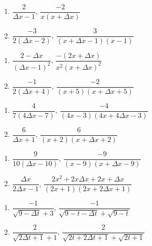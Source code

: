 \begin{multicols}{2}
\begin{enumerate}
\setcounter{enumi}{\value{HW}}

\item  $\dfrac{2}{\Delta x-1}$, $\dfrac{-2}{x(x+\Delta x)}$
\item $\dfrac{-3}{2(\Delta x - 2)}$, $\dfrac{3}{(x+\Delta x-1)(x-1)}$

\setcounter{HW}{\value{enumi}}
\end{enumerate}
\end{multicols}

\begin{multicols}{2}
\begin{enumerate}
\setcounter{enumi}{\value{HW}}

\item  $\dfrac{2-\Delta x}{(\Delta x - 1)^2}$, $\dfrac{-(2x+\Delta x)}{x^2(x+\Delta x)^2}$
\item  $\dfrac{-1}{2(\Delta x+4)}$, $\dfrac{-2}{(x+5)(x+\Delta x+5)}$

\setcounter{HW}{\value{enumi}}
\end{enumerate}
\end{multicols}

\begin{multicols}{2}
\begin{enumerate}
\setcounter{enumi}{\value{HW}}

\item $\dfrac{4}{7(4 \Delta x - 7)}$, $\dfrac{-4}{(4x-3)(4x+4\Delta x-3)}$
\item $\dfrac{6}{\Delta x + 1}$, $\dfrac{6}{(x+2)(x+\Delta x+2)}$

\setcounter{HW}{\value{enumi}}
\end{enumerate}
\end{multicols}

\begin{multicols}{2}
\begin{enumerate}
\setcounter{enumi}{\value{HW}}

\item $\dfrac{9}{10(\Delta x - 10)}$, $\dfrac{-9}{(x - 9)(x + \Delta x - 9)}$
\item $\dfrac{\Delta x}{2 \Delta x - 1}$, $\dfrac{2x^2+2x\Delta x+2x+\Delta x}{(2x+1)(2x+2\Delta x+1)}$

\setcounter{HW}{\value{enumi}}
\end{enumerate}
\end{multicols}

\begin{multicols}{2}
\begin{enumerate}
\setcounter{enumi}{\value{HW}}

\item $\dfrac{-1}{\sqrt{9-\Delta t} +3}$,   $\dfrac{-1}{\sqrt{9-t-\Delta t} + \sqrt{9-t}}$
\item $\dfrac{2}{\sqrt{2\Delta t+1} + 1}$, $\dfrac{2}{\sqrt{2t+2\Delta t+1} + \sqrt{2t+1}}$

\setcounter{HW}{\value{enumi}}
\end{enumerate}
\end{multicols}

